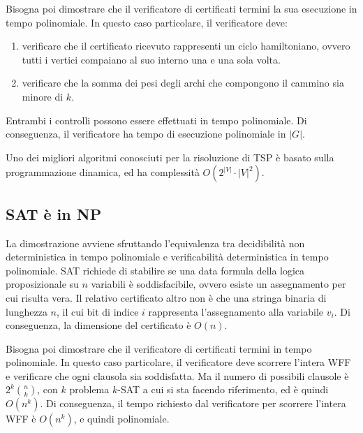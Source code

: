 Bisogna poi dimostrare che il verificatore di certificati termini la sua esecuzione in tempo polinomiale.
In questo caso particolare, il verificatore deve:
\begin{enumerate}
    \item verificare che il certificato ricevuto rappresenti un ciclo hamiltoniano, ovvero tutti i vertici compaiano al suo interno una e una sola volta.
    \item verificare che la somma dei pesi degli archi che compongono il cammino sia minore di $k$.
\end{enumerate}
Entrambi i controlli possono essere effettuati in tempo polinomiale.
Di conseguenza, il verificatore ha tempo di esecuzione polinomiale in $|G|$.

Uno dei migliori algoritmi conosciuti per la risoluzione di TSP è basato sulla programmazione dinamica, ed ha complessità $O(2^{|V|} \cdot |V|^2)$.

\subsection*{SAT è in NP}
La dimostrazione avviene sfruttando l'equivalenza tra decidibilità non deterministica in tempo polinomiale e verificabilità deterministica in tempo polinomiale.
SAT richiede di stabilire se una data formula della logica proposizionale su $n$ variabili è soddisfacibile, ovvero esiste un assegnamento per cui risulta vera.
Il relativo certificato altro non è che una stringa binaria di lunghezza $n$, il cui bit di indice $i$ rappresenta l'assegnamento alla variabile $v_i$.
Di conseguenza, la dimensione del certificato è $O(n)$.

Bisogna poi dimostrare che il verificatore di certificati termini in tempo polinomiale. In questo caso particolare, il verificatore deve scorrere l'intera WFF e verificare che ogni clausola sia soddisfatta.
Ma il numero di possibili clausole è $2^k \binom{n}{k}$, con $k$ problema $k$-SAT a cui si sta facendo riferimento, ed è quindi $O(n^k)$.
Di conseguenza, il tempo richiesto dal verificatore per scorrere l'intera WFF è $O(n^k)$, e quindi polinomiale.

